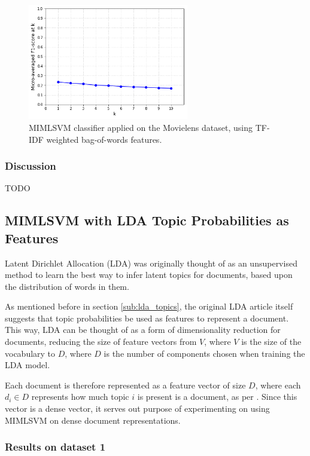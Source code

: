 \begin{figure}[H]
    \centering
    \includegraphics[width=7cm]{chapters/05_experiments/images/mimlsvm-tf-idf-movielens.png}
    \caption{MIMLSVM classifier applied on the Movielens dataset, using TF-IDF weighted bag-of-words features.}
    \label{fig:knn_lda_movielens}
\end{figure}

\subsubsection{Discussion}

{\color{red} TODO}

\subsection{MIMLSVM with LDA Topic Probabilities as Features}

Latent Dirichlet Allocation (LDA) \cite{blei_etal_2003} was originally thought of as an unsupervised method to learn the best way to infer latent topics for documents, based upon the distribution of words in them. 

As mentioned before in section \ref{sub:lda_topics}, the original LDA article itself suggests that topic probabilities be used as features to represent a document. This way, LDA can be thought of as a form of dimensionality reduction for documents, reducing the size of feature vectors from $V$, where $V$ is the size of the vocabulary to $D$, where $D$ is the number of components chosen when training the LDA model.

Each document is therefore represented as a feature vector of size $D$, where each $d_i \in D$ represents how much topic $i$ is present is a document, as per \cite{blei_etal_2003}. Since this vector is a dense vector, it serves out purpose of experimenting on using MIMLSVM on dense document representations.

\subsubsection{Results on dataset 1}

